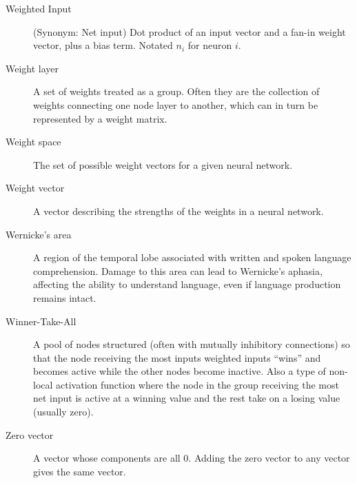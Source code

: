 \begin{description}
\item[Weighted Input] (Synonym: Net input) Dot product of an input vector and a fan-in weight vector, plus a bias term. Notated $n_i$ for neuron $i$.

\item[Weight layer] A set of weights treated as a group. Often they are the collection of weights connecting one node layer to another, which can in turn be represented by a weight matrix. %

\item[Weight space] The set of possible weight vectors for a given neural network.

\item[Weight vector] A vector describing the strengths of the weights in a neural network.

\item[Wernicke's area] A region of the temporal lobe associated with written and spoken language comprehension. Damage to this area can lead to Wernicke's aphasia, affecting the ability to understand language, even if language production remains intact.

\item[Winner-Take-All] A pool of nodes structured (often with mutually inhibitory connections) so that the node receiving the most inputs weighted inputs ``wins'' and becomes active while the other nodes become inactive. Also a type of non-local activation function where the node in the group receiving the most net input is active at a winning value and the rest take on a losing value (usually zero). 

\item[Zero vector] A vector whose components are all $0$. Adding the zero vector to any vector gives the same vector.

\end{description}